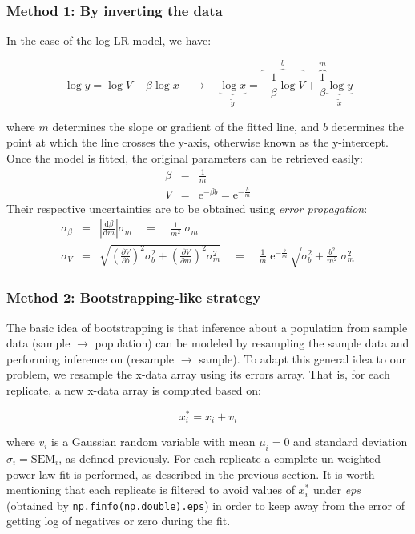 \subsubsection*{Method 1: By inverting the data}

In the case of the log-LR model, we have:
\begin{linenomath}
$$\log y = \log V + \beta\log x \quad\rightarrow\quad \underbrace{\log x}_{\tilde y} = \overbrace{-\frac{1}{\beta}\log V}^{b} + \overbrace{\frac{1}{\beta}}^{m}\underbrace{\log y}_{\tilde x}$$ 
\end{linenomath}
where $m$ determines the slope or gradient of the fitted line, and $b$ determines the point at which the line crosses the y-axis, otherwise known as the y-intercept. Once the model is fitted, the original parameters can be retrieved easily:
\begin{eqnarray*}
\beta &=& \frac{1}{m} \\
V &=& \mathrm{e}^{-\beta b} = \mathrm{e}^{-\frac{b}{m}}
\end{eqnarray*}
Their respective uncertainties are to be obtained using \emph{error propagation}:
\begin{eqnarray*}
    \sigma_\beta &=& \left|\frac{\mathrm{d}\beta}{\mathrm{d}m}\right|\sigma_m \quad=\quad \frac{1}{m^2}\;\sigma_m \\
    \sigma_V &=& \sqrt{\left(\frac{\partial V}{\partial b}\right)^{\!\!2}\sigma_b^2 +
      \left(\frac{\partial V}{\partial m}\right)^{\!\!2}\sigma_m^2} \quad=\quad
      \frac{1}{m}\;\mathrm{e}^{-\frac{b}{m}}\,\sqrt{\sigma_b^2 + \frac{b^2}{m^2}\;\sigma_m^2} 
\end{eqnarray*}

\subsubsection*{Method 2: Bootstrapping-like strategy}

The basic idea of bootstrapping is that inference about a population from sample data (sample $\rightarrow$ population) can be modeled by resampling the sample data and performing inference on (resample $\rightarrow$ sample). To adapt this general idea to our problem, we resample the x-data array using its errors array. That is, for each replicate, a new x-data array is computed based on:
\begin{linenomath}
$$x^*_i = x_i + v_i$$
\end{linenomath}
where $v_i$ is a Gaussian random variable with mean $\mu_i=0$ and standard deviation $\sigma_i=\mathrm{SEM}_i$, as defined previously. For each replicate a complete un-weighted power-law fit is performed, as described in the previous section. It is worth mentioning that each replicate is filtered to avoid values of $x^*_i$ under \emph{eps} (obtained by \texttt{np.finfo(np.double).eps}) in order to keep away from the error of getting log of negatives or zero during the fit.


